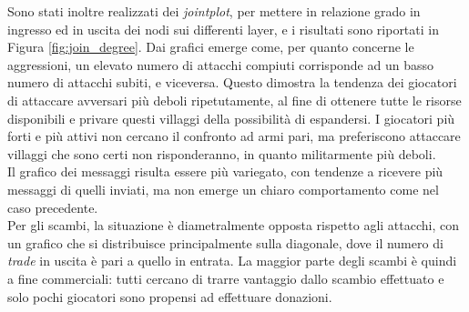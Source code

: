 Sono stati inoltre realizzati dei \textit{jointplot}, per mettere in relazione grado in ingresso ed in uscita dei nodi sui differenti layer, e i risultati sono riportati in Figura \ref{fig:join_degree}. Dai grafici emerge come, per quanto concerne le aggressioni, un elevato numero di attacchi compiuti corrisponde ad un basso numero di attacchi subiti, e viceversa. Questo dimostra la tendenza dei giocatori di attaccare avversari più deboli ripetutamente, al fine di ottenere tutte le risorse disponibili e privare questi villaggi della possibilità di espandersi. I giocatori più forti e più attivi non cercano il confronto ad armi pari, ma preferiscono attaccare villaggi che sono certi non risponderanno, in quanto militarmente più deboli.\\
Il grafico dei messaggi risulta essere più variegato, con tendenze a ricevere più messaggi di quelli inviati, ma non emerge un chiaro comportamento come nel caso precedente.\\
Per gli scambi, la situazione è diametralmente opposta rispetto agli attacchi, con un grafico che si distribuisce principalmente sulla diagonale, dove il numero di \textit{trade} in uscita è pari a quello in entrata. La maggior parte degli scambi è quindi a fine commerciali: tutti cercano di trarre vantaggio dallo scambio effettuato e solo pochi giocatori sono propensi ad effettuare donazioni.
